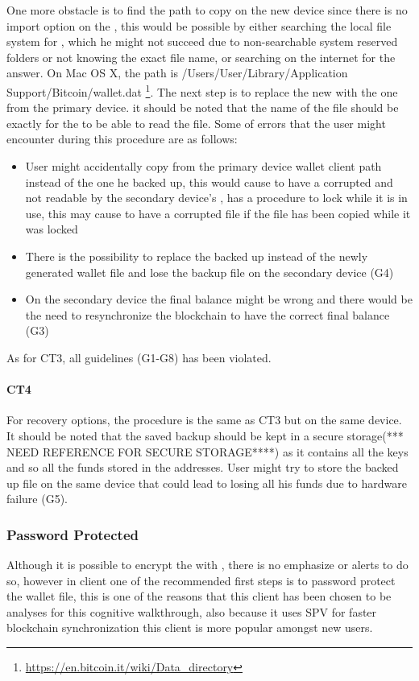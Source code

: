One more obstacle is to find the path to copy \walletfile on the new device since there is no import option on the \bitcoinclient, this would be possible by either searching the local file system for \walletfile, which he might not succeed due to non-searchable system reserved folders or not knowing the exact file name, or searching on the internet for the answer. On Mac OS X, the path is /Users/User/Library/Application Support/Bitcoin/wallet.dat \footnote{\url{https://en.bitcoin.it/wiki/Data_directory}}. The next step is to replace the new \walletfile with the one from the primary device. it should be noted that the name of the file should be exactly \walletfile for the \bitcoinclient to be able to read the file. Some of errors that the user might encounter during this procedure are as follows:
\begin{itemize}
	\item User might accidentally copy \walletfile from the primary device wallet client path instead of the one he backed up, this would cause to have a corrupted \walletfile and not readable by the secondary device's \bitcoinclient, \bitcoinclient has a procedure to lock \walletfile while it is in use, this may cause to have a corrupted file if the file has been copied while it was locked %
	\item There is the possibility to replace the backed up \walletfile instead of the newly generated wallet file and lose the backup file on the secondary device (G4)
	\item On the secondary device the final balance might be wrong and there would be the need to resynchronize the blockchain to have the correct final balance (G3)
\end{itemize}
As for CT3, all guidelines (G1-G8) has been violated.\

\paragraph{CT4} For recovery options, the procedure is the same as CT3 but on the same device. It should be noted that the saved backup \walletfile should be kept in a secure storage(*** NEED REFERENCE FOR SECURE STORAGE****) as it contains all the keys and so all the funds stored in the addresses. User might try to store the backed up file on the same device that could lead to losing all his funds due to hardware failure (G5). %


\subsubsection{Password Protected}
Although it is possible to encrypt the \walletfile with \bitcoinclient, there is no emphasize or alerts to do so, however in \multibit client one of the recommended first steps is to password protect the wallet file, this is one of the reasons that this client has been chosen to be analyses for this cognitive walkthrough, also because it uses SPV for faster blockchain synchronization this client is more popular amongst new users.


